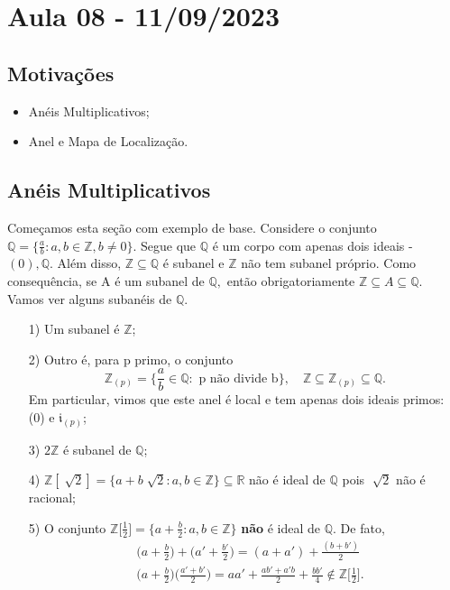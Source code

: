 \documentclass[algebraII_notes.tex]{subfiles}
\begin{document}
\section{Aula 08 - 11/09/2023}
\subsection{Motivações}
\begin{itemize}
	\item Anéis Multiplicativos;
	\item Anel e Mapa de Localização.
\end{itemize}
\subsection{Anéis Multiplicativos}
Começamos esta seção com exemplo de base. Considere o conjunto \(\mathbb{Q}=\biggl\{\frac{a}{b}: a, b\in \mathbb{Z}, b\neq 0\biggr\}.\)
Segue que \(\mathbb{Q}\) é um corpo com apenas dois ideais - \((0), \mathbb{Q}.\) Além disso,
\(\mathbb{Z}\subseteq \mathbb{Q}\) é subanel e \(\mathbb{Z}\) não tem subanel próprio. Como consequência, se
A é um subanel de \(\mathbb{Q},\) então obrigatoriamente \(\mathbb{Z}\subseteq A\subseteq \mathbb{Q}\). Vamos ver alguns subanéis de \(\mathbb{Q}.\)
\begin{example}
	\begin{itemize}
		\item[1)] Um subanel é \(\mathbb{Z}\);
		\item[2)] Outro é, para p primo, o conjunto
		      \[
			      \mathbb{Z}_{(p)} = \biggl\{\frac{a}{b}\in \mathbb{Q}:\text{ p não divide b}\biggr\},\quad \mathbb{Z}\subseteq \mathbb{Z}_{(p)}\subseteq \mathbb{Q}.
		      \]
		      Em particular, vimos que este anel é local e tem apenas dois ideais primos: (0) e \(\mathfrak{i}_{(p)}\);
		\item[3)] \(2\mathbb{Z}\) é subanel de \(\mathbb{Q}\);
		\item[4)] \(\mathbb{Z}[\sqrt[]{2}]=\{a + b\sqrt[]{2}: a, b\in \mathbb{Z}\}\subseteq \mathbb{R}\) não é ideal de \(\mathbb{Q}\) pois \(\sqrt[]{2}\) não é racional;
		\item[5)] O conjunto \(\mathbb{Z}\biggl[\frac{1}{2}\biggr]=\biggl\{a + \frac{b}{2}: a, b\in \mathbb{Z}\biggr\}\) \textbf{não} é ideal de \(\mathbb{Q}\). De fato,
		      \begin{align*}
			       & \biggl(a+\frac{b}{2}\biggr)+\biggl(a'+\frac{b'}{2}\biggr) = (a+a') + \frac{(b+b')}{2}                                                          \\
			       & \biggl(a+\frac{b}{2}\biggr)\biggl(\frac{a'+b'}{2}\biggr) = aa' + \frac{ab'+a'b}{2} + \frac{bb'}{4}\not\in \mathbb{Z}\biggl[\frac{1}{2}\biggr].
		      \end{align*}
	\end{itemize}
\end{example}
\end{document}
